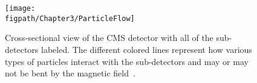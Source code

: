 \begin{figure}[!hbt]
	\centering
	\texttt{[image: \\figpath/Chapter3/ParticleFlow]}
	\caption{Cross-sectional view of the CMS detector with all of the sub-detectors labeled. The different colored lines represent how various types of particles interact with the sub-detectors and may or may not be bent by the magnetic field~\cite{CMSSlice}.}
	\label{fig:particle_flow}
\end{figure}

